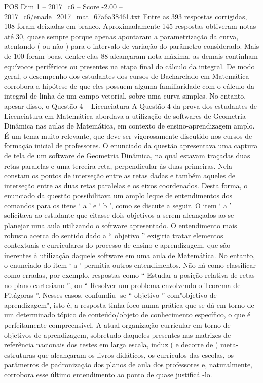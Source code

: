 \begin{textsample}{POS Dim 1 – 2017\_c6 – Score -2.00 – 2017\_c6/enade\_2017\_mat\_67a6a38461.txt}
Entre as 393 respostas corrigidas, 108 foram deixadas em branco.
Aproximadamente 145 respostas obtiveram notas até 30, quase sempre porque apenas apontaram a parametrização da curva, atentando ( ou não ) para o intervalo de variação do parâmetro considerado.
Mais de 100 foram boas, dentre elas 88 alcançaram nota máxima, as demais continham equívocos periféricos ou presentes na etapa final do cálculo da integral.
De modo geral, o desempenho dos estudantes dos cursos de Bacharelado em Matemática corrobora a hipótese de que eles possuem alguma familiaridade com o cálculo da integral de linha de um campo vetorial, sobre uma curva simples.
No entanto, apesar disso, o Questão 4 – Licenciatura A Questão 4 da prova dos estudantes de Licenciatura em Matemática abordava a utilização de softwares de Geometria Dinâmica nas aulas de Matemática, em contexto de ensino-aprendizagem amplo.
É um tema muito relevante, que deve ser vigorosamente discutido nos cursos de formação inicial de professores.
O enunciado da questão apresentava uma captura de tela de um software de Geometria Dinâmica, na qual estavam traçadas duas retas paralelas e uma terceira reta, perpendicular às duas primeiras.
Nela constam os pontos de interseção entre as retas dadas e também aqueles de interseção entre as duas retas paralelas e os eixos coordenados.
Desta forma, o enunciado da questão possibilitava um amplo leque de entendimentos dos comandos para os itens ‘ a ’ e ‘ b ’, como se discute a seguir.
O item ‘ a ’ solicitava ao estudante que citasse dois objetivos a serem alcançados ao se planejar uma aula utilizando o software apresentado.
O entendimento mais robusto acerca do sentido dado a “ objetivo ” exigiria tratar elementos contextuais e curriculares do processo de ensino e aprendizagem, que são inerentes à utilização daquele software em uma aula de Matemática.
No entanto, o enunciado do item ‘ a ’ permitia outros entendimentos.
Não há como classificar como erradas, por exemplo, respostas como “ Estudar a posição relativa de retas no plano cartesiano ”, ou “ Resolver um problema envolvendo o Teorema de Pitágoras ”.
Nesses casos, confundiu -se “ objetivo ” com"objetivo de aprendizagem", isto é, a resposta tinha foco numa prática que se dá em torno de um determinado tópico de conteúdo/objeto de conhecimento específico, o que é perfeitamente compreensível.
A atual organização curricular em torno de objetivos de aprendizagem, sobretudo daqueles presentes nas matrizes de referência nacionais dos testes em larga escala, induz ( e decorre de ) meta-estruturas que alcançaram os livros didáticos, os currículos das escolas, os parâmetros de padronização dos planos de aula dos professores e, naturalmente, corrobora esse último entendimento ao ponto de quase justificá -lo.

\end{textsample}

